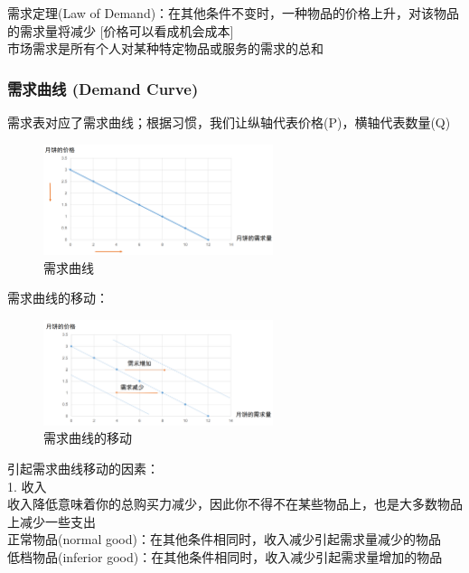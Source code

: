 \documentclass[12pt,a4paper]{article}
\begin{document}
需求定理(Law of Demand)：在其他条件不变时，一种物品的价格上升，对该物品的需求量将减少 [价格可以看成机会成本]\\

市场需求是所有个人对某种特定物品或服务的需求的总和\\
\subsubsection{需求曲线 (Demand Curve)}
需求表对应了需求曲线；根据习惯，我们让纵轴代表价格(P)，横轴代表数量(Q)\\

\begin{figure}[H] 
  \centering %
  \includegraphics[width=0.6\textwidth]{需求曲线.png} %
  \caption{需求曲线} %
\end{figure}

需求曲线的移动：\\

\begin{figure}[H] 
  \centering %
  \includegraphics[width=0.6\textwidth]{需求曲线的移动.png} %
  \caption{需求曲线的移动} %
\end{figure}

引起需求曲线移动的因素：\\

1. 收入\\
收入降低意味着你的总购买力减少，因此你不得不在某些物品上，也是大多数物品上减少一些支出\\
正常物品(normal good)：在其他条件相同时，收入减少引起需求量减少的物品\\
低档物品(inferior good)：在其他条件相同时，收入减少引起需求量增加的物品\\
\end{document}
